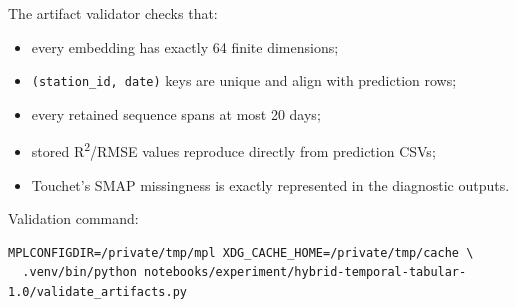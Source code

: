 \documentclass[11pt]{article}
\newcommand{\code}[1]{\begingroup\footnotesize\nolinkurl{#1}\endgroup}
\begin{document}
The artifact validator checks that:

\begin{itemize}
\item every embedding has exactly 64 finite dimensions;
\item \code{(station_id, date)} keys are unique and align with prediction rows;
\item every retained sequence spans at most 20 days;
\item stored R\textsuperscript{2}/RMSE values reproduce directly from prediction CSVs;
\item Touchet's SMAP missingness is exactly represented in the diagnostic outputs.
\end{itemize}

Validation command:

\begin{Verbatim}[fontsize=\small,frame=single,rulecolor=\color{lightgray}]
MPLCONFIGDIR=/private/tmp/mpl XDG_CACHE_HOME=/private/tmp/cache \
  .venv/bin/python notebooks/experiment/hybrid-temporal-tabular-1.0/validate_artifacts.py
\end{Verbatim}
\end{document}

